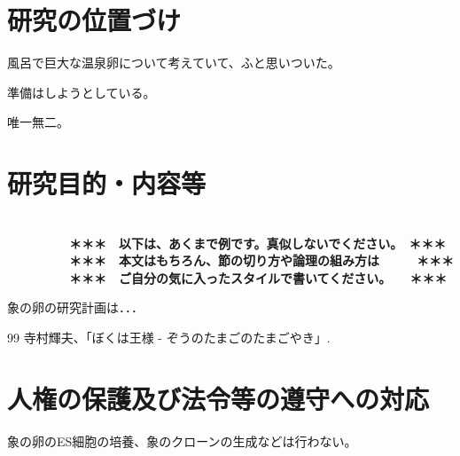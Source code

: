 \documentclass[11pt,a4j,dvipdfmx]{jarticle} 					%
\newcommand{\研究課題名}{象の卵}
\newcommand{\研究機関名}{逢坂大学}
\newcommand{\研究代表者氏名}{湯川秀樹}
\begin{document}

\section{研究の位置づけ}

		風呂で巨大な温泉卵について考えていて、ふと思いついた。

	準備はしようとしている。

	唯一無二。




\section{研究目的・内容等}

\JSPSInstructions		%
\textbf{\\　　　　　＊＊＊　以下は、あくまで例です。真似しないでください。　＊＊＊\\
　　　　　＊＊＊　本文はもちろん、節の切り方や論理の組み方は　　　＊＊＊\\
　　　　　＊＊＊　ご自分の気に入ったスタイルで書いてください。　　＊＊＊}

	象の卵の研究計画は．．．

	\vspace{1cm}
	\begin{thebibliography}{99}
		 寺村輝夫、「ぼくは王様 - ぞうのたまごのたまごやき」.
	\end{thebibliography}



\section{人権の保護及び法令等の遵守への対応}

	象の卵のES細胞の培養、象のクローンの生成などは行わない。
\end{document}
